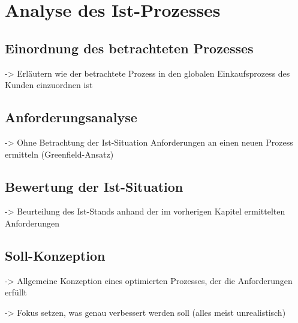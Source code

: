 \chapter{Analyse des Ist-Prozesses}

\section{Einordnung des betrachteten Prozesses}

-> Erläutern wie der betrachtete Prozess in den globalen Einkaufsprozess des Kunden einzuordnen ist

\section{Anforderungsanalyse}

-> Ohne Betrachtung der Ist-Situation Anforderungen an einen neuen Prozess ermitteln (Greenfield-Ansatz)

\section{Bewertung der Ist-Situation}

-> Beurteilung des Ist-Stands anhand der im vorherigen Kapitel ermittelten Anforderungen

\section{Soll-Konzeption}

-> Allgemeine Konzeption eines optimierten Prozesses, der die Anforderungen erfüllt

-> Fokus setzen, was genau verbessert werden soll (alles meist unrealistisch)